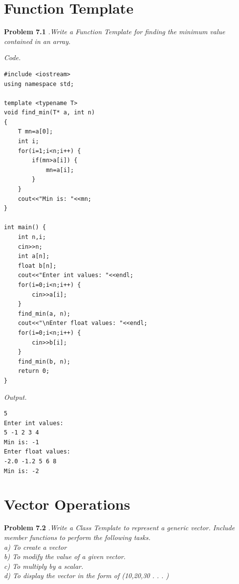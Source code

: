 \documentclass[12pt]{article}
\begin{document}
\section{Function Template}
\textbf{Problem 7.1} \textit{.Write a Function Template for finding the minimum value contained in an array.}

\textit{Code.}
\begin{lstlisting}
#include <iostream>
using namespace std;

template <typename T>
void find_min(T* a, int n)
{
    T mn=a[0];
    int i;
    for(i=1;i<n;i++) {
        if(mn>a[i]) {
            mn=a[i];
        }
    }
    cout<<"Min is: "<<mn;
}

int main() {
	int n,i;
	cin>>n;
	int a[n];
	float b[n];
	cout<<"Enter int values: "<<endl;
	for(i=0;i<n;i++) {
	    cin>>a[i];
	}
	find_min(a, n);
	cout<<"\nEnter float values: "<<endl;
	for(i=0;i<n;i++) {
	    cin>>b[i];
	}
	find_min(b, n);
	return 0;
}
\end{lstlisting}

\textit{Output.}
\begin{lstlisting}
5
Enter int values: 
5 -1 2 3 4
Min is: -1
Enter float values: 
-2.0 -1.2 5 6 8
Min is: -2
\end{lstlisting}

\section{Vector Operations}
\textbf{Problem 7.2} \textit{.Write a Class Template to represent a generic vector. Include member functions to perform the following tasks. \\
a) To create a vector\\
b) To modify the value of a given vector.\\ 
c) To multiply by a scalar. \\
d) To display the vector in the form of (10,20,30 . . . )}
\end{document}
